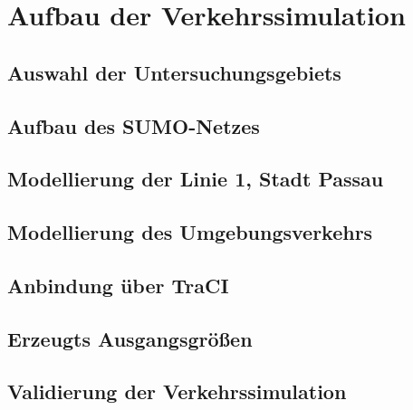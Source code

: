 \chapter{Aufbau der Verkehrssimulation}

\section{Auswahl der Untersuchungsgebiets}

\section{Aufbau des SUMO-Netzes}

\section{Modellierung der Linie 1, Stadt Passau}

\section{Modellierung des Umgebungsverkehrs}

\section{Anbindung über TraCI}

\section{Erzeugts Ausgangsgrößen}

\section{Validierung der Verkehrssimulation}